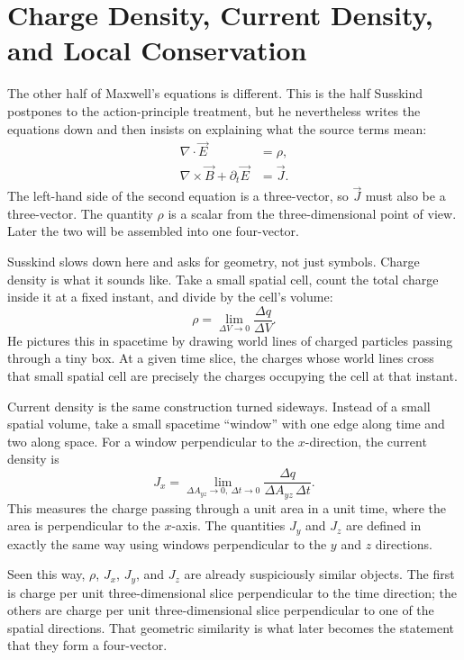 \section{Charge Density, Current Density, and Local Conservation}

The other half of Maxwell's equations is different. This is the half Susskind postpones to the action-principle treatment, but he nevertheless writes the equations down and then insists on explaining what the source terms mean:
\begin{align}
\nabla\cdot\vec E &= \rho,\\
\nabla\times\vec B+\partial_t\vec E &= \vec J.
\end{align}
The left-hand side of the second equation is a three-vector, so $\vec J$ must also be a three-vector. The quantity $\rho$ is a scalar from the three-dimensional point of view. Later the two will be assembled into one four-vector.

Susskind slows down here and asks for geometry, not just symbols. Charge density is what it sounds like. Take a small spatial cell, count the total charge inside it at a fixed instant, and divide by the cell's volume:
\begin{equation}
\rho=\lim_{\Delta V\to 0}\frac{\Delta q}{\Delta V}.
\end{equation}
He pictures this in spacetime by drawing world lines of charged particles passing through a tiny box. At a given time slice, the charges whose world lines cross that small spatial cell are precisely the charges occupying the cell at that instant.

Current density is the same construction turned sideways. Instead of a small spatial volume, take a small spacetime ``window'' with one edge along time and two along space. For a window perpendicular to the $x$-direction, the current density is
\begin{equation}
J_x=
\lim_{\Delta A_{yz}\to 0,\ \Delta t\to 0}
\frac{\Delta q}{\Delta A_{yz}\,\Delta t}.
\end{equation}
This measures the charge passing through a unit area in a unit time, where the area is perpendicular to the $x$-axis. The quantities $J_y$ and $J_z$ are defined in exactly the same way using windows perpendicular to the $y$ and $z$ directions.

Seen this way, $\rho$, $J_x$, $J_y$, and $J_z$ are already suspiciously similar objects. The first is charge per unit three-dimensional slice perpendicular to the time direction; the others are charge per unit three-dimensional slice perpendicular to one of the spatial directions. That geometric similarity is what later becomes the statement that they form a four-vector.

